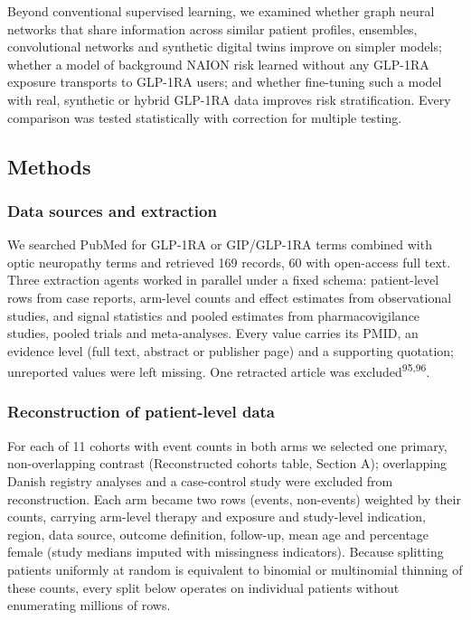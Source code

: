 \documentclass[
  11pt,
]{article}
\begin{document}
Beyond conventional supervised learning, we examined whether graph
neural networks that share information across similar patient profiles,
ensembles, convolutional networks and synthetic digital twins improve on
simpler models; whether a model of background NAION risk learned without
any GLP-1RA exposure transports to GLP-1RA users; and whether
fine-tuning such a model with real, synthetic or hybrid GLP-1RA data
improves risk stratification. Every comparison was tested statistically
with correction for multiple testing.

\subsection{Methods}\label{methods}

\subsubsection{Data sources and
extraction}\label{data-sources-and-extraction}

We searched PubMed for GLP-1RA or GIP/GLP-1RA terms combined with optic
neuropathy terms and retrieved 169 records, 60 with open-access full
text. Three extraction agents worked in parallel under a fixed schema:
patient-level rows from case reports, arm-level counts and effect
estimates from observational studies, and signal statistics and pooled
estimates from pharmacovigilance studies, pooled trials and
meta-analyses. Every value carries its PMID, an evidence level (full
text, abstract or publisher page) and a supporting quotation; unreported
values were left missing. One retracted article was
excluded\textsuperscript{95,96}.

\subsubsection{Reconstruction of patient-level
data}\label{reconstruction-of-patient-level-data}

For each of 11 cohorts with event counts in both arms we selected one
primary, non-overlapping contrast (Reconstructed cohorts table, Section
A); overlapping Danish registry analyses and a case-control study were
excluded from reconstruction. Each arm became two rows (events,
non-events) weighted by their counts, carrying arm-level therapy and
exposure and study-level indication, region, data source, outcome
definition, follow-up, mean age and percentage female (study medians
imputed with missingness indicators). Because splitting patients
uniformly at random is equivalent to binomial or multinomial thinning of
these counts, every split below operates on individual patients without
enumerating millions of rows.
\end{document}
